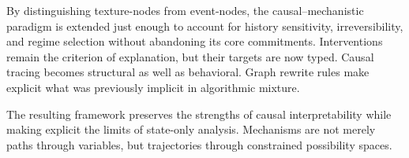 \documentclass[11pt]{article}
\begin{document}
By distinguishing texture-nodes from event-nodes, the causal–mechanistic paradigm
is extended just enough to account for history sensitivity, irreversibility, and
regime selection without abandoning its core commitments. Interventions remain the
criterion of explanation, but their targets are now typed. Causal tracing becomes
structural as well as behavioral. Graph rewrite rules make explicit what was
previously implicit in algorithmic mixture.

The resulting framework preserves the strengths of causal interpretability while
making explicit the limits of state-only analysis. Mechanisms are not merely paths
through variables, but trajectories through constrained possibility spaces.
\end{document}
